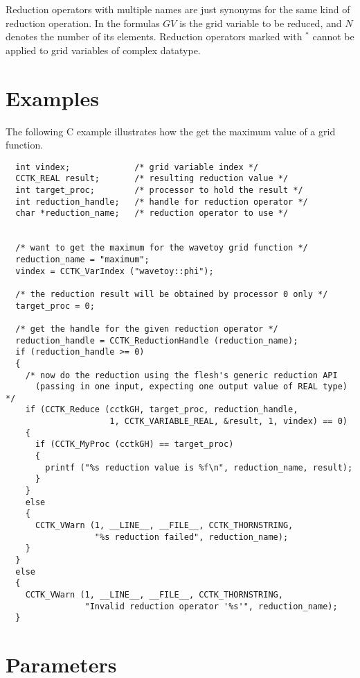 \documentclass{article}
\begin{document}
Reduction operators with multiple names are just synonyms for the same kind of
reduction operation. In the formulas $GV$ is the grid variable to be reduced,
and $N$ denotes the number of its elements. Reduction operators marked with
$^*$ cannot be applied to grid variables of complex datatype.
%
%
\section{Examples}
%
The following C example illustrates how the get the maximum value of a grid
function.
%
\begin{verbatim}
  int vindex;             /* grid variable index */
  CCTK_REAL result;       /* resulting reduction value */
  int target_proc;        /* processor to hold the result */
  int reduction_handle;   /* handle for reduction operator */
  char *reduction_name;   /* reduction operator to use */


  /* want to get the maximum for the wavetoy grid function */
  reduction_name = "maximum";
  vindex = CCTK_VarIndex ("wavetoy::phi");

  /* the reduction result will be obtained by processor 0 only */
  target_proc = 0;

  /* get the handle for the given reduction operator */
  reduction_handle = CCTK_ReductionHandle (reduction_name);
  if (reduction_handle >= 0)
  {
    /* now do the reduction using the flesh's generic reduction API
      (passing in one input, expecting one output value of REAL type) */
    if (CCTK_Reduce (cctkGH, target_proc, reduction_handle,
                     1, CCTK_VARIABLE_REAL, &result, 1, vindex) == 0)
    {
      if (CCTK_MyProc (cctkGH) == target_proc)
      {
        printf ("%s reduction value is %f\n", reduction_name, result);
      }
    }
    else
    {
      CCTK_VWarn (1, __LINE__, __FILE__, CCTK_THORNSTRING,
                  "%s reduction failed", reduction_name);
    }
  }
  else
  {
    CCTK_VWarn (1, __LINE__, __FILE__, CCTK_THORNSTRING,
                "Invalid reduction operator '%s'", reduction_name);
  }
\end{verbatim}




\section{Parameters} 
\end{document}
